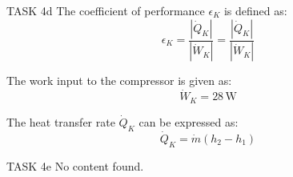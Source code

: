 TASK 4d  
The coefficient of performance \( \epsilon_K \) is defined as:  
\[
\epsilon_K = \frac{|\dot{Q}_K|}{|\dot{W}_K|} = \frac{|\dot{Q}_K|}{|\dot{W}_K|}
\]  

The work input to the compressor is given as:  
\[
\dot{W}_K = 28 \, \text{W}
\]  

The heat transfer rate \( \dot{Q}_K \) can be expressed as:  
\[
\dot{Q}_K = \dot{m} (h_2 - h_1)
\]  

TASK 4e  
No content found.